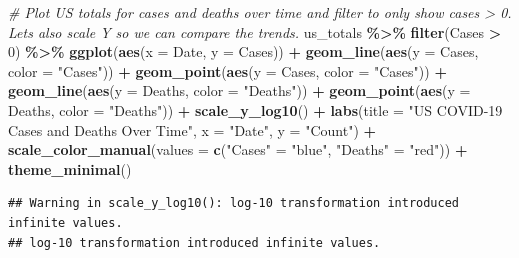 \documentclass[
]{article}
\newenvironment{Shaded}{\begin{snugshade}}{\end{snugshade}}
\newcommand{\AttributeTok}[1]{\textcolor[rgb]{0.13,0.29,0.53}{#1}}
\newcommand{\CommentTok}[1]{\textcolor[rgb]{0.56,0.35,0.01}{\textit{#1}}}
\newcommand{\DecValTok}[1]{\textcolor[rgb]{0.00,0.00,0.81}{#1}}
\newcommand{\FunctionTok}[1]{\textcolor[rgb]{0.13,0.29,0.53}{\textbf{#1}}}
\newcommand{\NormalTok}[1]{#1}
\newcommand{\OtherTok}[1]{\textcolor[rgb]{0.56,0.35,0.01}{#1}}
\newcommand{\SpecialCharTok}[1]{\textcolor[rgb]{0.81,0.36,0.00}{\textbf{#1}}}
\newcommand{\StringTok}[1]{\textcolor[rgb]{0.31,0.60,0.02}{#1}}
\begin{document}
\begin{Shaded}
\begin{Highlighting}[]
\CommentTok{\# Plot US totals for cases and deaths over time and filter to only show cases \textgreater{} 0.  Lets also scale Y so we can compare the trends.}
\NormalTok{us\_totals }\SpecialCharTok{\%\textgreater{}\%}
  \FunctionTok{filter}\NormalTok{(Cases }\SpecialCharTok{\textgreater{}} \DecValTok{0}\NormalTok{) }\SpecialCharTok{\%\textgreater{}\%}
  \FunctionTok{ggplot}\NormalTok{(}\FunctionTok{aes}\NormalTok{(}\AttributeTok{x =}\NormalTok{ Date, }\AttributeTok{y =}\NormalTok{ Cases)) }\SpecialCharTok{+}
  \FunctionTok{geom\_line}\NormalTok{(}\FunctionTok{aes}\NormalTok{(}\AttributeTok{y =}\NormalTok{ Cases, }\AttributeTok{color =} \StringTok{"Cases"}\NormalTok{)) }\SpecialCharTok{+}
  \FunctionTok{geom\_point}\NormalTok{(}\FunctionTok{aes}\NormalTok{(}\AttributeTok{y =}\NormalTok{ Cases, }\AttributeTok{color =} \StringTok{"Cases"}\NormalTok{)) }\SpecialCharTok{+}
  \FunctionTok{geom\_line}\NormalTok{(}\FunctionTok{aes}\NormalTok{(}\AttributeTok{y =}\NormalTok{ Deaths, }\AttributeTok{color =} \StringTok{"Deaths"}\NormalTok{)) }\SpecialCharTok{+}
  \FunctionTok{geom\_point}\NormalTok{(}\FunctionTok{aes}\NormalTok{(}\AttributeTok{y =}\NormalTok{ Deaths, }\AttributeTok{color =} \StringTok{"Deaths"}\NormalTok{)) }\SpecialCharTok{+}
  \FunctionTok{scale\_y\_log10}\NormalTok{() }\SpecialCharTok{+}
  \FunctionTok{labs}\NormalTok{(}\AttributeTok{title =} \StringTok{"US COVID{-}19 Cases and Deaths Over Time"}\NormalTok{,}
       \AttributeTok{x =} \StringTok{"Date"}\NormalTok{,}
       \AttributeTok{y =} \StringTok{"Count"}\NormalTok{) }\SpecialCharTok{+}
  \FunctionTok{scale\_color\_manual}\NormalTok{(}\AttributeTok{values =} \FunctionTok{c}\NormalTok{(}\StringTok{"Cases"} \OtherTok{=} \StringTok{"blue"}\NormalTok{, }\StringTok{"Deaths"} \OtherTok{=} \StringTok{"red"}\NormalTok{)) }\SpecialCharTok{+}
  \FunctionTok{theme\_minimal}\NormalTok{()}
\end{Highlighting}
\end{Shaded}

\begin{verbatim}
## Warning in scale_y_log10(): log-10 transformation introduced infinite values.
## log-10 transformation introduced infinite values.
\end{verbatim}
\end{document}
